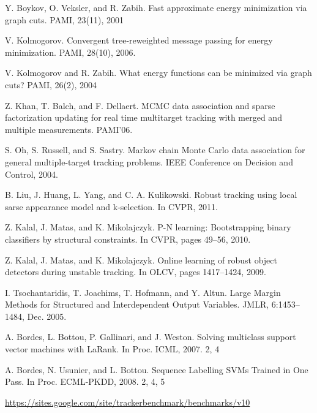 \documentclass{acm_proc_article-sp}
\begin{document}
\begin{thebibliography}{99}
Y. Boykov, O. Veksler, and R. Zabih. Fast approximate energy minimization via graph cuts. PAMI, 23(11), 2001

V. Kolmogorov. Convergent tree-reweighted message passing for energy minimization. PAMI, 28(10), 2006.

V. Kolmogorov and R. Zabih. What energy functions can be minimized via graph cuts? PAMI, 26(2), 2004

Z. Khan, T. Balch, and F. Dellaert. MCMC data association and sparse factorization updating for real time multitarget tracking with merged and multiple measurements. PAMI’06.

S. Oh, S. Russell, and S. Sastry. Markov chain Monte Carlo data association for general multiple-target tracking problems. IEEE Conference on Decision and Control, 2004.

B. Liu, J. Huang, L. Yang, and C. A. Kulikowski. Robust tracking using local sarse appearance model and k-selection. In CVPR, 2011.

Z. Kalal, J. Matas, and K. Mikolajczyk. P-N learning: Bootstrapping binary classifiers by structural constraints. In CVPR, pages 49–56, 2010.

Z. Kalal, J. Matas, and K. Mikolajczyk. Online learning of robust object detectors during unstable tracking. In OLCV, pages 1417–1424, 2009.

I. Tsochantaridis, T. Joachims, T. Hofmann, and Y. Altun. Large Margin Methods for Structured and Interdependent Output Variables. JMLR, 6:1453–1484, Dec. 2005.

A. Bordes, L. Bottou, P. Gallinari, and J. Weston. Solving multiclass support vector machines with LaRank. In Proc. ICML, 2007. 2, 4

A. Bordes, N. Usunier, and L. Bottou. Sequence Labelling SVMs Trained in One Pass. In Proc. ECML-PKDD, 2008. 2, 4, 5

\url{https://sites.google.com/site/trackerbenchmark/benchmarks/v10}

\end{thebibliography}
\end{document}
